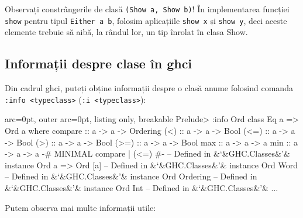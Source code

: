 \begin{tcolorbox}[colback=yellow!40, colframe=yellow!60, breakable]
Observați constrângerile de clasă \texttt{(Show a, Show b)}! În implementarea funcției \texttt{show} pentru tipul \texttt{Either a b}, folosim aplicațiile \texttt{show x} și \texttt{show y}, deci aceste elemente trebuie să aibă, la rândul lor, un tip înrolat în clasa Show.
\end{tcolorbox}

\subsection*{ Informații despre clase în ghci }

Din cadrul ghci, puteți obține informații despre o clasă anume folosind comanda \texttt{:info \textless typeclass\textgreater } (\texttt{:i \textless typeclass\textgreater }):


\begin{tcblisting}{ arc=0pt, outer arc=0pt, listing only, breakable}
Prelude> :info Ord
class Eq a => Ord a where
  compare :: a -> a -> Ordering
  (<) :: a -> a -> Bool
  (<=) :: a -> a -> Bool
  (>) :: a -> a -> Bool
  (>=) :: a -> a -> Bool
  max :: a -> a -> a
  min :: a -> a -> a
  {-# MINIMAL compare | (<=) #-}
        -- Defined in &‘&GHC.Classes&’&
instance Ord a => Ord [a] -- Defined in &‘&GHC.Classes&’&
instance Ord Word -- Defined in &‘&GHC.Classes&’&
instance Ord Ordering -- Defined in &‘&GHC.Classes&’&
instance Ord Int -- Defined in &‘&GHC.Classes&’&
...

\end{tcblisting}


Putem observa mai multe informații utile:

